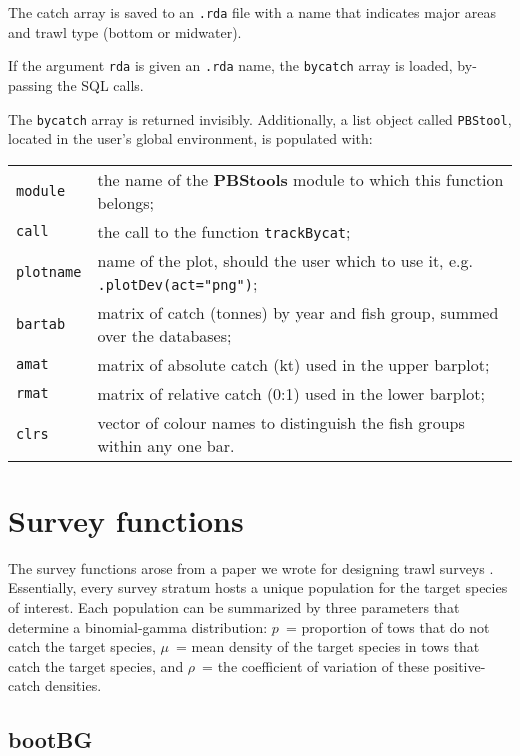 \documentclass[letterpaper,12pt,fleqn]{article}
\def\tab{\hspace{0.5 in}}
\newcommand{\code}[1]{\small\texttt{#1}\normalsize}
\newcommand{\pkg}[1]{{\bf #1}}
\begin{document}
The catch array is saved to an \code{.rda} file with a name that indicates major areas and trawl type (bottom or midwater).
  
\tab If the argument \code{rda} is given an \code{.rda} name, the \code{bycatch} array is loaded, by-passing the SQL calls.

\tab The \code{bycatch} array is returned invisibly. Additionally, a list object called \code{PBStool}, located in the user's global environment, is populated with:\\
\begin{tabular}{ll}
  \code{module}   & the name of the \pkg{PBStools} module to which this function belongs;\\
  \code{call}     & the call to the function \code{trackBycat};\\
  \code{plotname} & name of the plot, should the user which to use it, e.g. \code{.plotDev(act="png")};\\
  \code{bartab}   & matrix of catch (tonnes) by year and fish group, summed over the databases;\\
  \code{amat}     & matrix of absolute catch (kt) used in the upper barplot;\\
  \code{rmat}     & matrix of relative catch (0:1) used in the lower barplot;\\
  \code{clrs}     & vector of colour names to distinguish the fish groups within any one bar.\\
\end{tabular}

\clearpage

\section {Survey functions}

\tab The survey functions arose from a paper we wrote for designing trawl surveys \citep{Schnute-Haigh:2003}. Essentially, every survey stratum hosts a unique population for the target species of interest. Each population can be summarized by three parameters that determine a binomial-gamma distribution: $p$~= proportion of tows that do not catch the target species, $\mu$~= mean density of the target species in tows that catch the target species, and $\rho$~= the coefficient of variation of these positive-catch densities.

\subsection {bootBG}
\end{document}
